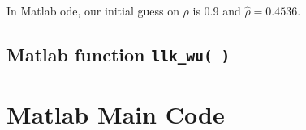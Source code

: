 \documentclass[11pt,letter]{article}
\newcommand{\code}[1]{\texttt{#1}}
\begin{document}
In Matlab ode, our initial guess on $\rho$ is 0.9 and $\hat{\rho} = 0.4536$.

\subsection*{Matlab function \code{llk\_wu( )}}


\section*{Matlab Main Code}

\end{document}

